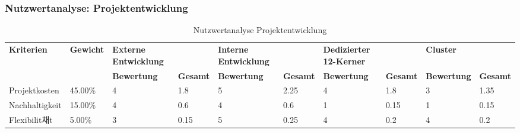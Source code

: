 \subsubsection{Nutzwertanalyse: Projektentwicklung}
\begin{table}[!htp]
	\centering
	\caption{Nutzwertanalyse Projektentwicklung}
	\label{nwa:projektentwicklung}
	\begin{tabular}{llllllllll}
		\rowcolor[HTML]{9698ED}
		{\color[HTML]{FFFFFF} \textbf{Kriterien}} & {\color[HTML]{FFFFFF} \textbf{Gewicht}} & {\color[HTML]{FFFFFF} \textbf{Externe Entwicklung}} & {\color[HTML]{FFFFFF} \textbf{}}       & {\color[HTML]{FFFFFF} \textbf{Interne Entwicklung}} & {\color[HTML]{FFFFFF} \textbf{}}       & {\color[HTML]{FFFFFF} \textbf{Dedizierter 12-Kerner}} & {\color[HTML]{FFFFFF} \textbf{}}       & {\color[HTML]{FFFFFF} \textbf{Cluster}}   & {\color[HTML]{FFFFFF} \textbf{}}       \\
		\rowcolor[HTML]{9698ED}
		{\color[HTML]{FFFFFF} \textbf{}}          & {\color[HTML]{FFFFFF} \textbf{}}        & {\color[HTML]{FFFFFF} \textbf{Bewertung}}           & {\color[HTML]{FFFFFF} \textbf{Gesamt}} & {\color[HTML]{FFFFFF} \textbf{Bewertung}}           & {\color[HTML]{FFFFFF} \textbf{Gesamt}} & {\color[HTML]{FFFFFF} \textbf{Bewertung}}             & {\color[HTML]{FFFFFF} \textbf{Gesamt}} & {\color[HTML]{FFFFFF} \textbf{Bewertung}} & {\color[HTML]{FFFFFF} \textbf{Gesamt}} \\
		Projektkosten                             & 45.00\%                                 & 4                                                   & 1.8                                    & 5                                                   & 2.25                                   & 4                                                     & 1.8                                    & 3                                         & 1.35                                   \\
		\rowcolor[HTML]{BBDAFF}
		Nachhaltigkeit                            & 15.00\%                                 & 4                                                   & 0.6                                    & 4                                                   & 0.6                                    & 1                                                     & 0.15                                   & 1                                         & 0.15                                   \\
		Flexibilit채t                              & 5.00\%                                  & 3                                                   & 0.15                                   & 5                                                   & 0.25                                   & 4                                                     & 0.2                                    & 4                                         & 0.2                                    \\

\end{tabular}
\end{table}
